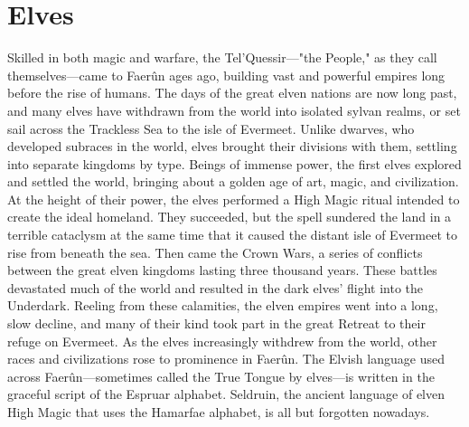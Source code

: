 \documentclass[10pt,a4paper,twoside,twocolumn,openany,bg=print,nodeprecatedcode]{dndbook}
\begin{document}
\section{Elves}
Skilled in both magic and warfare, the Tel'Quessir—"the People," as they call themselves—came to Faerûn ages ago, building vast and powerful empires long before the rise of humans. The days of the great elven nations are now long past, and many elves have withdrawn from the world into isolated sylvan realms, or set sail across the Trackless Sea to the isle of Evermeet.
Unlike dwarves, who developed subraces in the world, elves brought their divisions with them, settling into separate kingdoms by type. Beings of immense power, the first elves explored and settled the world, bringing about a golden age of art, magic, and civilization. At the height of their power, the elves performed a High Magic ritual intended to create the ideal homeland. They succeeded, but the spell sundered the land in a terrible cataclysm at the same time that it caused the distant isle of Evermeet to rise from beneath the sea.
Then came the Crown Wars, a series of conflicts between the great elven kingdoms lasting three thousand years. These battles devastated much of the world and resulted in the dark elves' flight into the Underdark.
Reeling from these calamities, the elven empires went into a long, slow decline, and many of their kind took part in the great Retreat to their refuge on Evermeet. As the elves increasingly withdrew from the world, other races and civilizations rose to prominence in Faerûn.
The Elvish language used across Faerûn—sometimes called the True Tongue by elves—is written in the graceful script of the Espruar alphabet. Seldruin, the ancient language of elven High Magic that uses the Hamarfae alphabet, is all but forgotten nowadays.
\end{document}
